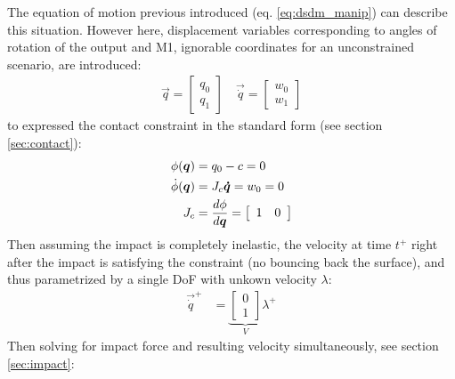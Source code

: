 The equation of motion previous introduced (eq. \eqref{eq:dsdm_manip}) can describe this situation. However here, displacement variables corresponding to angles of rotation of the output and M1, ignorable coordinates for an unconstrained scenario, are introduced:
%
\begin{align}
\vec{q} = \left[ \begin{array}{c} 	q_0 \\ q_1 \end{array} \right] \quad
\vec{\dot{q}} = \left[ \begin{array}{c} 	w_0 \\ w_1 \end{array} \right]
\label{eq:dsdm_impact_q}
\end{align}
%
to expressed the contact constraint in the standard form (see section \ref{sec:contact}):
%
\begin{align}
\phi( \vec{q} )       &= q_0 - c = 0 \\
\dot{\phi}( \vec{q} ) &= J_c\vec{\dot{q}} =  w_0 = 0 \\
J_c                   &= \frac{d \phi}{d\vec{q}} = \left[ \begin{array}{c c} 1 & 0 \end{array} \right]
\label{eq:dsdm_impact_const}
\end{align}
%
Then assuming the impact is completely inelastic, the velocity at time $t^+$ right after the impact is satisfying the constraint (no bouncing back the surface), and thus parametrized by a single DoF with unkown velocity $\lambda$:
%
\begin{align}
\vec{\dot{q}}^+ &= \underbrace{ \left[ \begin{array}{c} 0 \\ 1 \end{array} \right] }_{ V } \lambda^+
\label{eq:dsdm_impact_jaco}
\end{align}
%
Then solving for impact force and resulting velocity simultaneously, see section \ref{sec:impact}:
%
